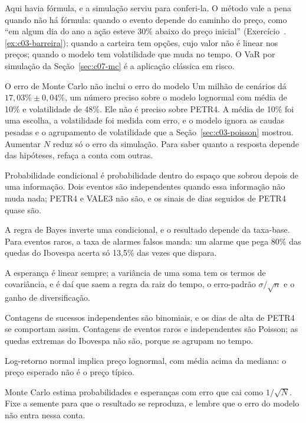 Aqui havia fórmula, e a simulação serviu para conferi-la. O método vale a pena quando não há fórmula: quando o evento depende do caminho do preço, como ``em algum dia do ano a ação esteve 30\% abaixo do preço inicial'' (Exercício~\thechapter.\ref{ex:c03-barreira}); quando a carteira tem opções, cujo valor não é linear nos preços; quando o modelo tem volatilidade que muda no tempo. O VaR por simulação da Seção~\ref{sec:c07-mc} é a aplicação clássica em risco.

\begin{armadilha}{O erro de Monte Carlo não inclui o erro do modelo}
Um milhão de cenários dá $17,03\% \pm 0,04\%$, um número preciso sobre o modelo lognormal com média de 10\% e volatilidade de 48\%. Ele não é preciso sobre PETR4. A média de 10\% foi uma escolha, a volatilidade foi medida com erro, e o modelo ignora as caudas pesadas e o agrupamento de volatilidade que a Seção~\ref{sec:c03-poisson} mostrou. Aumentar $N$ reduz só o erro da simulação. Para saber quanto a resposta depende das hipóteses, refaça a conta com outras.
\end{armadilha}

\begin{resumo}
  \item Probabilidade condicional é probabilidade dentro do espaço que sobrou depois de uma informação. Dois eventos são independentes quando essa informação não muda nada; PETR4 e VALE3 não são, e os sinais de dias seguidos de PETR4 quase são.
  \item A regra de Bayes inverte uma condicional, e o resultado depende da taxa-base. Para eventos raros, a taxa de alarmes falsos manda: um alarme que pega 80\% das quedas do Ibovespa acerta só 13,5\% das vezes que dispara.
  \item A esperança é linear sempre; a variância de uma soma tem os termos de covariância, e é daí que saem a regra da raiz do tempo, o erro-padrão $\sigma/\sqrt{n}$ e o ganho de diversificação.
  \item Contagens de sucessos independentes são binomiais, e os dias de alta de PETR4 se comportam assim. Contagens de eventos raros e independentes são Poisson; as quedas extremas do Ibovespa não são, porque se agrupam no tempo.
  \item Log-retorno normal implica preço lognormal, com média acima da mediana: o preço esperado não é o preço típico.
  \item Monte Carlo estima probabilidades e esperanças com erro que cai como $1/\sqrt{N}$. Fixe a semente para que o resultado se reproduza, e lembre que o erro do modelo não entra nessa conta.
\end{resumo}

